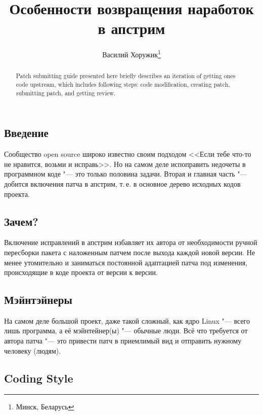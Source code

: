 \documentclass[10pt, a5paper]{article}
\begin{document}
\title{Особенности возвращения наработок в апстрим}%

\author{Василий Хоружик\footnote{Минск, Беларусь}}
\maketitle

\begin{abstract}
Patch submitting guide presented here briefly describes an iteration of getting ones code upstream, which includes following steps: code modification, creating patch, submitting patch, and getting review.
\end{abstract}

\subsection*{Введение}

Сообщество open source широко известно своим подходом <<Если тебе что-то не нравится, возьми и исправь>>. Но на самом деле испоправить недочеты в программном коде "--- это только половина задачи. Вторая и главная часть "--- добится включения патча в апстрим, т.\,е. в основное дерево исходных кодов проекта.

\subsection*{Зачем?}

Включение исправлений в апстрим избавляет их автора от необходимости ручной пересборки пакета с наложенным патчем после выхода каждой новой версии. Не менее утомительно и заниматься постоянной адаптацией патча под изменения, происходящие в коде проекта от версии к версии.

\subsection*{Мэйнтэйнеры}

На самом деле большой проект, даже такой сложный, как ядро Linux "--- всего лишь программа, а её мэйнтейнер(ы) "--- обычные люди. Всё что требуется от автора патча "--- это привести патч в приемлимый вид и отправить нужному человеку (людям).

\subsection*{Coding Style}
\end{document}
